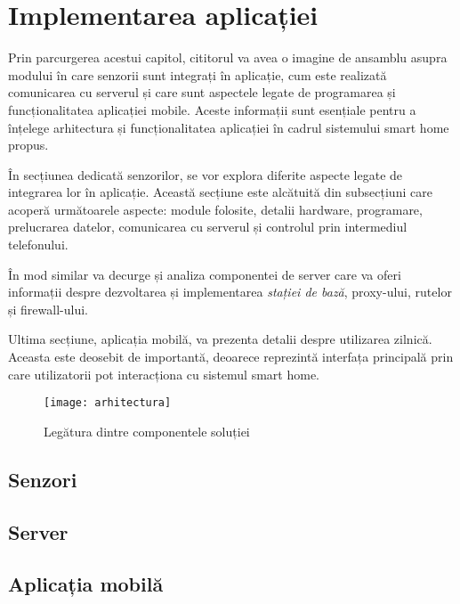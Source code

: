 \chapter{Implementarea aplicației}

Prin parcurgerea acestui capitol, cititorul va avea o imagine de ansamblu asupra modului în care senzorii sunt integrați în aplicație, cum este realizată comunicarea cu serverul și care sunt aspectele legate de programarea și funcționalitatea aplicației mobile. Aceste informații sunt esențiale pentru a înțelege arhitectura și funcționalitatea aplicației în cadrul sistemului smart home propus.

În secțiunea dedicată senzorilor, se vor explora diferite aspecte legate de integrarea lor în aplicație. Această secțiune este alcătuită din subsecțiuni care acoperă următoarele aspecte: module folosite, detalii hardware, programare, prelucrarea datelor, comunicarea cu serverul și controlul prin intermediul telefonului.

În mod similar va decurge și analiza componentei de server care va oferi informații despre dezvoltarea și implementarea \emph{stației de bază}, proxy-ului, rutelor și firewall-ului.

Ultima secțiune, aplicația mobilă, va prezenta detalii despre utilizarea zilnică. Aceasta este deosebit de importantă, deoarece reprezintă interfața principală prin care utilizatorii pot interacționa cu sistemul smart home.

\begin{figure}[h]
	\centering
	\texttt{[image: arhitectura]}
	\caption{Legătura dintre componentele soluției}
	\label{fig:arhitectura}
\end{figure}

\break

\section{Senzori}


\section{Server}

\section{Aplicația mobilă}
